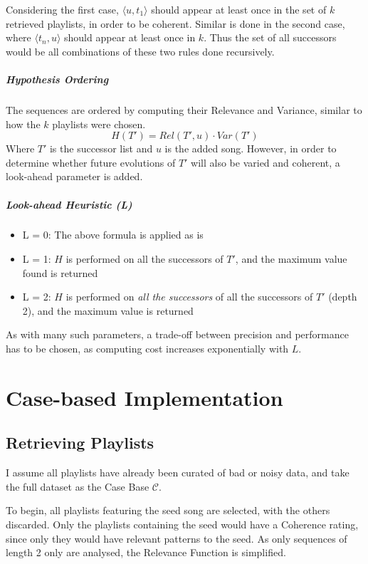 \documentclass[a4paper, 12pt]{report}
\begin{document}
Considering the first case, \(\langle u, t_1\rangle\) should appear at least once in the set of \(k\) retrieved playlists, in order to be coherent. Similar is done 
in the second case, where \(\langle t_n, u\rangle\) should appear at least once in \(k\). Thus the set of all successors would be all combinations of these two rules done recursively.

\paragraph{Hypothesis Ordering}
The sequences are ordered by computing their Relevance and Variance, similar to how the \(k\) playlists were chosen. 
\[H(T') = Rel(T', u) \cdot Var(T')\]
Where \(T'\) is the successor list and \(u\) is the added song. 
However, in order to determine whether future evolutions of \(T'\) will also be varied and coherent, a look-ahead parameter is added.
\paragraph{Look-ahead Heuristic (L)}
\begin{itemize}
    \item L = 0: The above formula is applied as is
    \item L = 1: \(H\) is performed on all the successors of \(T'\), and the maximum value found is returned 
    \item L = 2: \(H\) is performed on \emph{all the successors} of all the successors of \(T'\) (depth 2), and the maximum value is returned
\end{itemize}
As with many such parameters, a trade-off between precision and performance has to be chosen, as computing cost increases exponentially with \(L\).



\chapter{Case-based Implementation}
\section{Retrieving Playlists}
I assume all playlists have already been curated of bad or noisy data, and take the full dataset as the Case Base \(\mathcal{C}\).

To begin, all playlists featuring the seed song are selected, with the others discarded. Only the playlists containing the seed would have a Coherence rating, since
only they would have relevant patterns to the seed. As only sequences of length 2 only are analysed, the Relevance Function is simplified.
\end{document}
